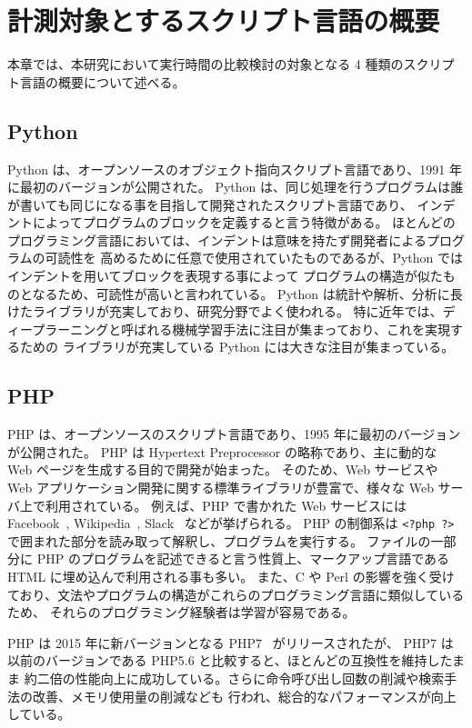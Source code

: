 \chapter{計測対象とするスクリプト言語の概要}
\label{cha:script-language}

本章では、本研究において実行時間の比較検討の対象となる 4 種類のスクリプト言語の概要について述べる。

\section{Python}
\label{cha:script-language:python}

Python は、オープンソースのオブジェクト指向スクリプト言語であり、1991 年に最初のバージョンが公開された。
Python は、同じ処理を行うプログラムは誰が書いても同じになる事を目指して開発されたスクリプト言語であり、
インデントによってプログラムのブロックを定義すると言う特徴がある。
ほとんどのプログラミング言語においては、インデントは意味を持たず開発者によるプログラムの可読性を
高めるために任意で使用されていたものであるが、Python ではインデントを用いてブロックを表現する事によって
プログラムの構造が似たものとなるため、可読性が高いと言われている。
Python は統計や解析、分析に長けたライブラリが充実しており、研究分野でよく使われる。
特に近年では、ディープラーニングと呼ばれる機械学習手法に注目が集まっており、これを実現するための
ライブラリが充実している Python には大きな注目が集まっている。

\section{PHP}
\label{cha:script-language:php}

PHP は、オープンソースのスクリプト言語であり、1995 年に最初のバージョンが公開された。
PHP は Hypertext Preprocessor の略称であり、主に動的な Web ページを生成する目的で開発が始まった。
そのため、Web サービスや Web アプリケーション開発に関する標準ライブラリが豊富で、様々な Web サーバ上で利用されている。
例えば、PHP で書かれた Web サービスには Facebook~\cite{Facebook}, Wikipedia~\cite{Wikipedia},
Slack~\cite{Slack} などが挙げられる。
PHP の制御系は \verb|<?php ?>| で囲まれた部分を読み取って解釈し、プログラムを実行する。
ファイルの一部分に PHP のプログラムを記述できると言う性質上、マークアップ言語である HTML に埋め込んで利用される事も多い。
また、C や Perl の影響を強く受けており、文法やプログラムの構造がこれらのプログラミング言語に類似しているため、
それらのプログラミング経験者は学習が容易である。

PHP は 2015 年に新バージョンとなる PHP7~\cite{PHP7} がリリースされたが、
PHP7 は以前のバージョンである PHP5.6 と比較すると、ほとんどの互換性を維持したまま
約二倍の性能向上に成功している。さらに命令呼び出し回数の削減や検索手法の改善、メモリ使用量の削減なども
行われ、総合的なパフォーマンスが向上している。

